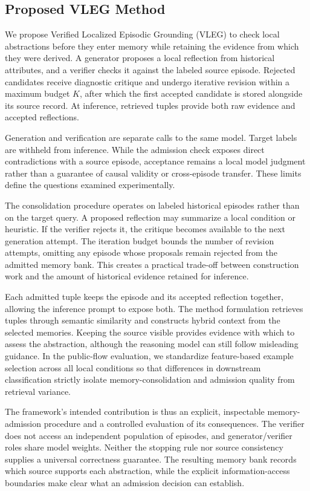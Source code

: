 \documentclass[journal]{IEEEtran}
\theoremstyle{definition}
\theoremstyle{remark}
\begin{document}
\subsection{Proposed VLEG Method}
We propose Verified Localized Episodic Grounding (VLEG) to check local abstractions before they enter memory while retaining the evidence from which they were derived. A generator proposes a local reflection from historical attributes, and a verifier checks it against the labeled source episode. Rejected candidates receive diagnostic critique and undergo iterative revision within a maximum budget $K$, after which the first accepted candidate is stored alongside its source record. At inference, retrieved tuples provide both raw evidence and accepted reflections.

Generation and verification are separate calls to the same model. Target labels are withheld from inference. While the admission check exposes direct contradictions with a source episode, acceptance remains a local model judgment rather than a guarantee of causal validity or cross-episode transfer. These limits define the questions examined experimentally.

The consolidation procedure operates on labeled historical episodes rather than on the target query. A proposed reflection may summarize a local condition or heuristic. If the verifier rejects it, the critique becomes available to the next generation attempt. The iteration budget bounds the number of revision attempts, omitting any episode whose proposals remain rejected from the admitted memory bank. This creates a practical trade-off between construction work and the amount of historical evidence retained for inference.

Each admitted tuple keeps the episode and its accepted reflection together, allowing the inference prompt to expose both. The method formulation retrieves tuples through semantic similarity and constructs hybrid context from the selected memories. Keeping the source visible provides evidence with which to assess the abstraction, although the reasoning model can still follow misleading guidance. In the public-flow evaluation, we standardize feature-based example selection across all local conditions so that differences in downstream classification strictly isolate memory-consolidation and admission quality from retrieval variance.

The framework's intended contribution is thus an explicit, inspectable memory-admission procedure and a controlled evaluation of its consequences. The verifier does not access an independent population of episodes, and generator/verifier roles share model weights. Neither the stopping rule nor source consistency supplies a universal correctness guarantee. The resulting memory bank records which source supports each abstraction, while the explicit information-access boundaries make clear what an admission decision can establish.
\end{document}
